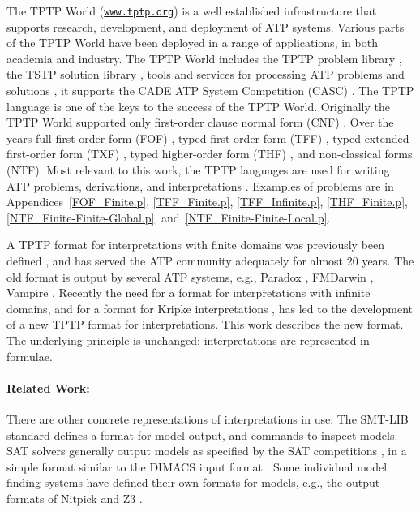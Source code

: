 \documentclass{easychair}
\begin{document}
The TPTP World \cite{Sut17} (\href{https://www.tptp.org}{\tt www.tptp.org}) is a well established 
infrastructure that supports research, development, and deployment of 
ATP systems.
Various parts of the TPTP World have been deployed in a range of applications, in both academia 
and industry.
The TPTP World includes the TPTP problem library \cite{Sut09}, 
the TSTP solution library \cite{Sut10}, 
tools and services for processing ATP problems and solutions \cite{Sut10}, 
it supports the CADE ATP System Competition (CASC) \cite{Sut16}.
The TPTP language \cite{Sut23-IGPL} is one of the keys to the success of the TPTP World.
Originally the TPTP World supported only first-order clause normal form (CNF)
\cite{SS98-JAR}.
Over the years full first-order form (FOF)
\cite{Sut09}, 
typed first-order form (TFF)
\cite{SS+12,BP13-TFF1}, 
typed extended first-order form (TXF)
\cite{SK18}, 
typed higher-order form (THF)
\cite{SB10,KSR16}, 
and non-classical forms (NTF).
Most relevant to this work, the TPTP languages are used for writing ATP problems, 
derivations, and interpretations \cite{SS+06,Sut08-KEAPPA}.
Examples of problems are in Appendices~\ref{FOF_Finite.p}, \ref{TFF_Finite.p},
\ref{TFF_Infinite.p}, \ref{THF_Finite.p}, \ref{NTF_Finite-Finite-Global.p}, 
and~\ref{NTF_Finite-Finite-Local.p}.

A TPTP format for interpretations with finite domains was previously been defined \cite{SS+06},
and has served the ATP community adequately for almost 20 years. 
The old format is output by several ATP systems, e.g., Paradox \cite{CS03}, FMDarwin \cite{BF+06}, 
Vampire \cite{KV13}.
Recently the need for a format for interpretations with infinite domains, and for a format for 
Kripke interpretations \cite{Kri63}, has led to the development of a new TPTP format for 
interpretations.
This work describes the new format.
The underlying principle is unchanged: interpretations are represented in formulae.

\paragraph{Related Work:}
There are other concrete representations of interpretations in use:
The SMT-LIB standard \cite{BFT17} defines a format for model output, and commands to inspect 
models.  
SAT solvers generally output models as specified by the SAT competitions \cite{JL+12}, in a 
simple format similar to the DIMACS input format \cite{Bab93}.
Some individual model finding systems have defined their own formats for models, e.g., the 
output formats of Nitpick and Z3 \cite{dMB08}.
\end{document}
